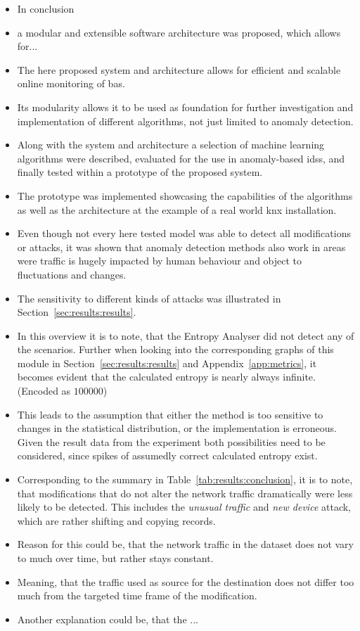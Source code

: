 \begin{itemize}
	\item In conclusion
	\item a modular and extensible software architecture was proposed, which allows for...
	\item The here proposed system and architecture allows for efficient and scalable online monitoring of \gls{bas}.
	\item Its modularity allows it to be used as foundation for further investigation and implementation of different algorithms, not just limited to anomaly detection.
	\item Along with the system and architecture a selection of machine learning algorithms were described, evaluated for the use in anomaly-based \glspl{ids}, and finally tested within a prototype of the proposed system.
	\item The prototype was implemented showcasing the capabilities of the algorithms as well as the architecture at the example of a real world \gls{knx} installation.
	\item Even though not every here tested model was able to detect all modifications or attacks, it was shown that anomaly detection methods also work in areas were traffic is hugely impacted by human behaviour and object to fluctuations and changes.
	\item The sensitivity to different kinds of attacks was illustrated in Section~\ref{sec:results:results}.
	\item In this overview it is to note, that the Entropy Analyser did not detect any of the scenarios. Further when looking into the corresponding graphs of this module in Section~\ref{sec:results:results} and Appendix~\ref{app:metrics}, it becomes evident that the calculated entropy is nearly always infinite. (Encoded as \(100 000\)) 
	\item This leads to the assumption that either the method is too sensitive to changes in the statistical distribution, or the implementation is erroneous. Given the result data from the experiment both possibilities need to be considered, since spikes of assumedly correct calculated entropy exist.
	
	\item Corresponding to the summary in Table~\ref{tab:results:conclusion}, it is to note, that modifications that do not alter the network traffic dramatically were less likely to be detected. This includes the \emph{unusual traffic} and \emph{new device} attack, which are rather shifting and copying records.
	\item Reason for this could be, that the network traffic in the dataset does not vary to much over time, but rather stays constant.
	\item Meaning, that the traffic used as source for the destination does not differ too much from the targeted time frame of the modification.
	\item Another explanation could be, that the ...
	

\end{itemize}
